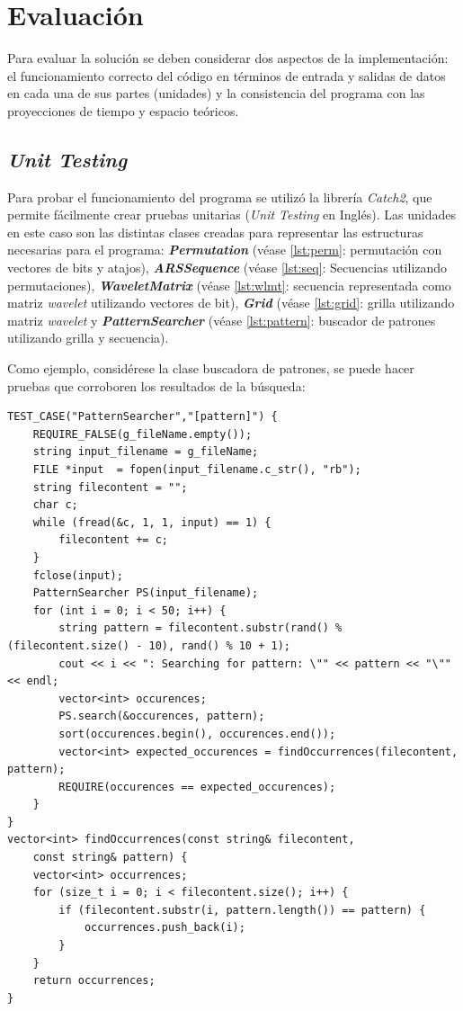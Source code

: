 \chapter{Evaluación}

Para evaluar la solución se deben considerar dos aspectos de la implementación: el funcionamiento correcto del código en términos de entrada y salidas de datos en cada una de sus partes (unidades) y la consistencia del programa con las proyecciones de tiempo y espacio teóricos.


\section{\textit{Unit Testing}}

Para probar el funcionamiento del programa se utilizó la librería \textit{Catch2}\cite{catch2}, que permite fácilmente crear pruebas  unitarias (\textit{Unit Testing} en Inglés). Las unidades en este caso son las distintas clases creadas para representar las estructuras necesarias para el programa: \textit{\textbf{Permutation}} (véase \ref{lst:perm}: permutación con vectores de bits y atajos), \textit{\textbf{ARSSequence}} (véase \ref{lst:seq}: Secuencias utilizando permutaciones), \textit{\textbf{WaveletMatrix}} (véase \ref{lst:wlmt}: secuencia representada como matriz \textit{wavelet} utilizando vectores de bit), \textit{\textbf{Grid}} (véase \ref{lst:grid}: grilla utilizando matriz \textit{wavelet} y \textit{\textbf{PatternSearcher}} (véase \ref{lst:pattern}: buscador de patrones utilizando grilla y secuencia).

Como ejemplo, considérese la clase buscadora de patrones, se puede hacer pruebas que corroboren los resultados de la búsqueda:

\begin{lstlisting}[style=cppstyle, caption={\textit{\textit{Test }de búsqueda}}, label={lst:search-test}] 
TEST_CASE("PatternSearcher","[pattern]") {
    REQUIRE_FALSE(g_fileName.empty());
    string input_filename = g_fileName;
    FILE *input  = fopen(input_filename.c_str(), "rb");  
    string filecontent = "";
    char c;
    while (fread(&c, 1, 1, input) == 1) {
        filecontent += c;
    }
    fclose(input);
    PatternSearcher PS(input_filename);
    for (int i = 0; i < 50; i++) {
        string pattern = filecontent.substr(rand() % (filecontent.size() - 10), rand() % 10 + 1);
        cout << i << ": Searching for pattern: \"" << pattern << "\"" << endl;
        vector<int> occurences;
        PS.search(&occurences, pattern);
        sort(occurences.begin(), occurences.end());
        vector<int> expected_occurences = findOccurrences(filecontent, pattern);
        REQUIRE(occurences == expected_occurences);
    }    
}
vector<int> findOccurrences(const string& filecontent, 
    const string& pattern) {
    vector<int> occurrences;
    for (size_t i = 0; i < filecontent.size(); i++) {
        if (filecontent.substr(i, pattern.length()) == pattern) {
            occurrences.push_back(i);
        }
    }
    return occurrences;
}
\end{lstlisting}


